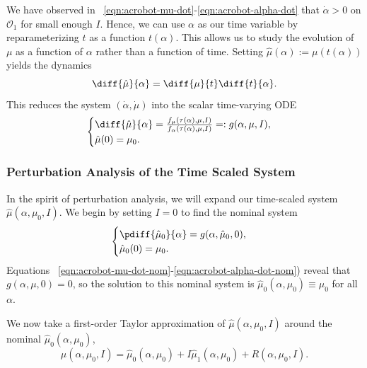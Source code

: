 We have observed in ~\eqref{eqn:acrobot-mu-dot}-\eqref{eqn:acrobot-alpha-dot}
that \(\dot{\alpha} > 0\) on \(\mathcal{O}_1\) for small enough \(I\). 
Hence, we can use \(\alpha\) as our time variable by reparameterizing \(t\) as a
function \(t(\alpha)\).
This allows us to study the evolution of \(\mu\) as a function of \(\alpha\)
rather than a function of time.
Setting \(\hat{\mu}(\alpha) := \mu(t(\alpha))\) yields the dynamics
\[
    \diff{\hat{\mu}}{\alpha} = 
    \diff{\mu}{t} \diff{t}{\alpha}
    .
\] 
This reduces the system \((\dot{\alpha},\dot{\mu})\) into the scalar
time-varying ODE 
\begin{equation}\label{eqn:muhat-dot}
    \begin{cases}
        \diff{\hat{\mu}}{\alpha} 
        = \frac{f_\mu(\tau(\alpha),\mu,I)}{f_\alpha(\tau(\alpha),\mu,I)}
        =: g(\alpha,\mu,I)
        , \\
        \hat{\mu}(0) = \mu_0
        .
    \end{cases}
\end{equation}

\subsubsection*{Perturbation Analysis of the Time Scaled System}

In the spirit of perturbation analysis, we will expand our time-scaled system
\(\hat{\mu}(\alpha,\mu_0,I)\).
We begin by setting \(I = 0\) to find the nominal system
\[
\begin{cases}
    \pdiff{\hat{\mu}_0}{\alpha} = g(\alpha,\hat{\mu}_0,0)
    , \\
    \hat{\mu}_0(0) = \mu_0
   .
\end{cases}
\]
Equations ~\eqref{eqn:acrobot-mu-dot-nom}-\eqref{eqn:acrobot-alpha-dot-nom})
reveal that \(g(\alpha,\mu,0) = 0\),
so the solution to this nominal system is 
\(\hat{\mu}_0(\alpha,\mu_0) \equiv \mu_0\) for all \(\alpha\).

We now take a first-order Taylor approximation of \(\hat{\mu}(\alpha,\mu_0,I)\)
around the nominal \(\hat{\mu}_0(\alpha,\mu_0)\),
\begin{equation}\label{eqn:acrobot-muhat-approx}
    \hat{\mu}(\alpha,\mu_0,I) = \hat{\mu}_0(\alpha,\mu_0) + I
    \hat{\mu}_1(\alpha,\mu_0)
    + R(\alpha,\mu_0,I)
    .
\end{equation}

